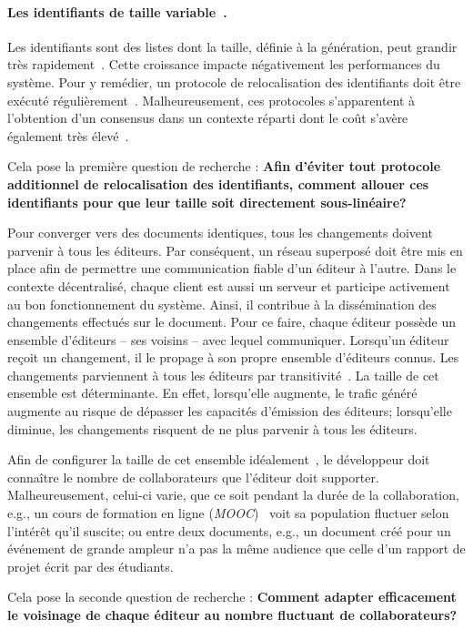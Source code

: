 \paragraph{Les identifiants de taille variable~\cite{weiss2009logoot}.} Les
identifiants sont des listes dont la taille, définie à la génération, peut
grandir très rapidement~\cite{weiss2009logoot}. Cette croissance impacte
négativement les performances du système. Pour y remédier, un protocole de
relocalisation des identifiants doit être exécuté
régulièrement~\cite{zawirskiasynchronous}. Malheureusement, ces protocoles
s'apparentent à l'obtention d'un consensus dans un contexte réparti dont le coût
s'avère également très élevé~\cite{mostefaoui2015signature}.

Cela pose la première question de recherche : \textbf{Afin d'éviter tout
  protocole additionnel de relocalisation des identifiants, comment allouer ces
  identifiants pour que leur taille soit directement sous-linéaire?}

Pour converger vers des documents identiques, tous les changements doivent
parvenir à tous les éditeurs. Par conséquent, un réseau superposé doit être mis
en place afin de permettre une communication fiable d'un éditeur à l'autre.
Dans le contexte décentralisé, chaque client est aussi un serveur et participe
activement au bon fonctionnement du système. Ainsi, il contribue à la
dissémination des changements effectués sur le document. Pour ce faire, chaque
éditeur possède un ensemble d'éditeurs -- ses voisins -- avec lequel
communiquer. Lorsqu'un éditeur reçoit un changement, il le propage à son propre
ensemble d'éditeurs connus. Les changements parviennent à tous les éditeurs par
transitivité~\cite{birman1999bimodal}.  La taille de cet ensemble est
déterminante. En effet, lorsqu'elle augmente, le trafic généré augmente au
risque de dépasser les capacités d'émission des éditeurs; lorsqu'elle diminue,
les changements risquent de ne plus parvenir à tous les éditeurs.

Afin de configurer la taille de cet ensemble idéalement~\cite{erdos1959random},
le développeur doit connaître le nombre de collaborateurs que l'éditeur doit
supporter. Malheureusement, celui-ci varie, que ce soit pendant la durée de la
collaboration, e.g., un cours de formation en ligne
(\emph{MOOC})~\cite{breslow2013studying} voit sa population fluctuer selon
l'intérêt qu'il suscite; ou entre deux documents, e.g., un document créé pour un
événement de grande ampleur n'a pas la même audience que celle d'un rapport de
projet écrit par des étudiants.

Cela pose la seconde question de recherche : \textbf{Comment adapter
  efficacement le voisinage de chaque éditeur au nombre fluctuant de
  collaborateurs?}




